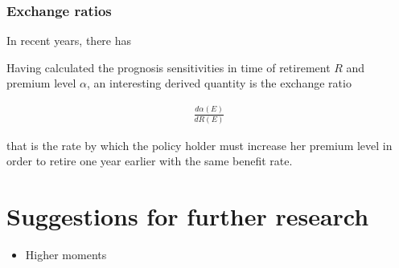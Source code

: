 \documentclass{article}
\newcommand{\1}[1]{\mathbbm{1}_{\left\lbrace #1 \right\rbrace}}
\theoremstyle{break}
\theoremstyle{remark}
\numberwithin{equation}{section}
\begin{document}
\subsubsection{Exchange ratios}

In recent years, there has

Having calculated the prognosis sensitivities in time of retirement $R$ and premium level $\alpha$, an interesting derived quantity is the exchange ratio

\begin{align*}
	\frac{d \alpha (E)}{d R (E)}
\end{align*}

that is the rate by which the policy holder must increase her premium level in order to retire one year earlier with the same benefit rate. 

\section{Suggestions for further research}

\begin{itemize}
	\item Higher moments
\end{itemize}

\newpage
\end{document}
